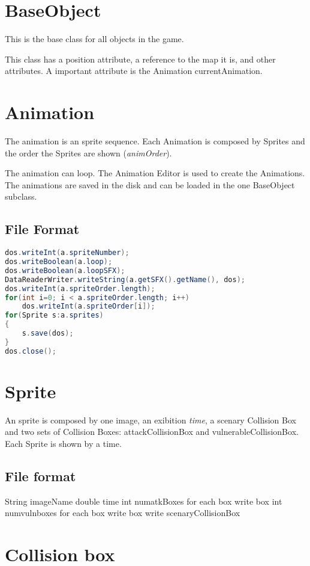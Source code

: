 \section{BaseObject}
	This is the base class for all objects in the game. 
	
	This class has a position attribute, a reference to the map it is, and other attributes. A important attribute is the Animation currentAnimation.

\section{Animation}
	The animation is an sprite sequence. Each Animation is composed by Sprites and the order the Sprites are shown (\textit{animOrder}).
		
	The animation can loop. The Animation Editor is used to create the Animations. The animations are saved in the disk and can be loaded in the one BaseObject subclass.
	
	\subsection{File Format}
\begin{lstlisting}[caption={File format},label={animfileformat},language=Java]
dos.writeInt(a.spriteNumber);
dos.writeBoolean(a.loop);
dos.writeBoolean(a.loopSFX);
DataReaderWriter.writeString(a.getSFX().getName(), dos);
dos.writeInt(a.spriteOrder.length);
for(int i=0; i < a.spriteOrder.length; i++)
	dos.writeInt(a.spriteOrder[i]);
for(Sprite s:a.sprites)
{
	s.save(dos);
}
dos.close();
\end{lstlisting}
	
	
	
\section{Sprite}
	An sprite is composed by one image, an exibition \textit{time}, a scenary Collision Box and two sets of Collision Boxes: attackCollisionBox and vulnerableCollisionBox.
	Each Sprite is shown by a time.

		\subsection{File format}
		String imageName
		double time
		int numatkBoxes
		for each box	
			write box
		int numvulnboxes
		for each box
			write box
		write scenaryCollisionBox
		
\section{Collision box}

